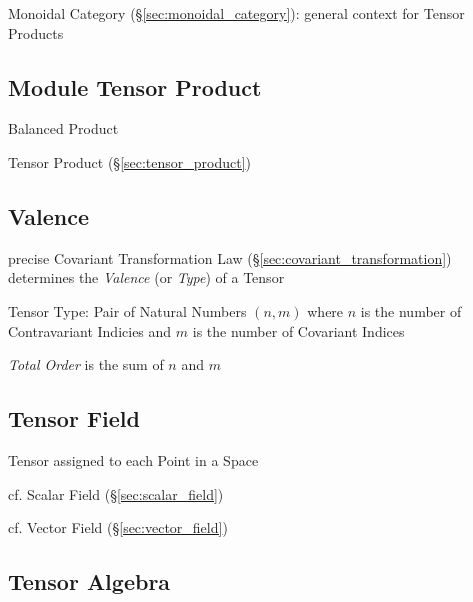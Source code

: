 Monoidal Category (\S\ref{sec:monoidal_category}): general context for
Tensor Products



\subsection{Module Tensor Product}\label{sec:module_tensor_product}

Balanced Product

\fist Tensor Product (\S\ref{sec:tensor_product})



\subsection{Valence}\label{sec:valence}

precise Covariant Transformation Law
(\S\ref{sec:covariant_transformation}) determines the \emph{Valence}
(or \emph{Type}) of a Tensor

Tensor Type: Pair of Natural Numbers $(n,m)$ where $n$ is the number
of Contravariant Indicies and $m$ is the number of Covariant Indices

\emph{Total Order} is the sum of $n$ and $m$



\subsection{Tensor Field}\label{sec:tensor_field}

Tensor assigned to each Point in a Space

cf. Scalar Field (\S\ref{sec:scalar_field})

cf. Vector Field (\S\ref{sec:vector_field})



\subsection{Tensor Algebra}\label{sec:tensor_algebra}

